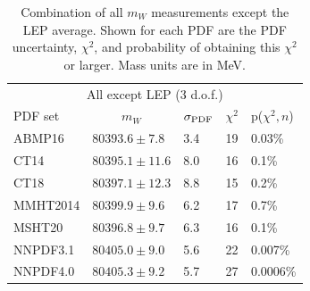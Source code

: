\begin{table}[!tp]
  \centering
\begin{tabular}{lllll}
\hline \hline

                                     \multicolumn{5}{c}{All except LEP (3 d.o.f.)} \\
PDF set                      & \multicolumn{1}{c}{$m_W$} & $\sigma_{\scriptsize\textrm{PDF}}$ & $\chi^2$ & p($\chi^2,n$) \\
\hline
                             ABMP16 & $80393.6 \pm  7.8$ &     3.4 &     19   & 0.03\% \\
                               CT14 & $80395.1 \pm 11.6$ &     8.0 &     16   & 0.1\% \\
                               CT18 & $80397.1 \pm 12.3$ &     8.8 &     15   & 0.2\% \\
                           MMHT2014 & $80399.9 \pm  9.6$ &     6.2 &     17   & 0.7\% \\
                             MSHT20 & $80396.8 \pm  9.7$ &     6.3 &     16   & 0.1\% \\
                           NNPDF3.1 & $80405.0 \pm  9.0$ &     5.6 &     22   & 0.007\% \\
                           NNPDF4.0 & $80405.3 \pm  9.2$ &     5.7 &     27   & 0.0006\% \\
\hline \hline
\end{tabular}
\caption{Combination of all $m_W$ measurements except the LEP average.  Shown for each PDF are the 
  PDF uncertainty, $\chi^2$, and probability of
  obtaining this $\chi^2$ or larger.  Mass units are in MeV.
  \label{tbl:all2_opt2}
}
\end{table}
